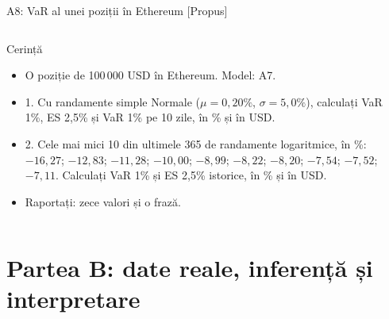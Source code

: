 \begin{frame}{A8: VaR al unei poziții în Ethereum [Propus]}
\propsub
\itemsize{\scriptsize}
\begin{columns}[T]
\begin{column}{\taskw}
\begin{block}{Cerință}
\begin{itemize}
    \item O poziție de 100\,000 USD în Ethereum. Model: A7.
    \item 1. Cu randamente simple Normale ($\mu = 0{,}20\%$, $\sigma = 5{,}0\%$), calculați VaR 1\%, ES 2,5\% și VaR 1\% pe 10 zile, în \% și în USD.
    \item 2. Cele mai mici 10 din ultimele 365 de randamente logaritmice, în \%: $-16{,}27$; $-12{,}83$; $-11{,}28$; $-10{,}00$; $-8{,}99$; $-8{,}22$; $-8{,}20$; $-7{,}54$; $-7{,}52$; $-7{,}11$. Calculați VaR 1\% și ES 2,5\% istorice, în \% și în USD.
    \item Raportați: zece valori și o frază.
\end{itemize}
\end{block}
\end{column}
\begin{column}{\solw}
\end{column}
\end{columns}
\end{frame}


\section{Partea B: date reale, inferență și interpretare}

